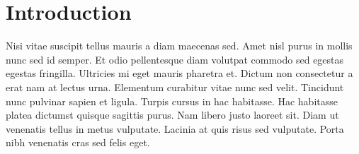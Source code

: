 \section{Introduction}

Nisi vitae suscipit tellus mauris a diam maecenas sed. Amet nisl purus in mollis nunc sed id semper. Et odio pellentesque diam volutpat commodo sed egestas egestas fringilla. Ultricies mi eget mauris pharetra et. Dictum non consectetur a erat nam at lectus urna. Elementum curabitur vitae nunc sed velit. Tincidunt nunc pulvinar sapien et ligula. Turpis cursus in hac habitasse. Hac habitasse platea dictumst quisque sagittis purus. Nam libero justo laoreet sit. Diam ut venenatis tellus in metus vulputate. Lacinia at quis risus sed vulputate. Porta nibh venenatis cras sed felis eget.